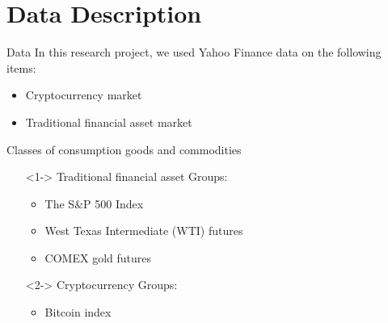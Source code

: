 \section{Data Description}
    \begin{frame}{Data}
    In this research project, we used Yahoo Finance data on the following items: \begin{itemize}
    \item Cryptocurrency market
    \item  Traditional financial asset market
   
    
    \end{itemize}
    \end{frame}
    
    \begin{frame}{Classes of consumption goods and commodities}
    \begin{itemize}
    \item[]<1->    Traditional financial asset Groups:
        \begin{itemize}
          \item The S\&P 500 Index 
    \item West Texas Intermediate (WTI) futures 
    \item COMEX gold futures 
         \end{itemize}
    \item[]<2->    Cryptocurrency Groups:
        \begin{itemize}
        \item Bitcoin index
         \end{itemize}
    \end{itemize}
    \end{frame}
    
